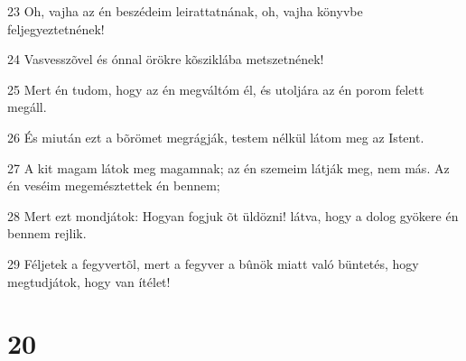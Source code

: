 \par 23 Oh, vajha az én beszédeim leirattatnának, oh, vajha könyvbe feljegyeztetnének!
\par 24 Vasvesszõvel és ónnal örökre kõsziklába metszetnének!
\par 25 Mert én tudom, hogy az én megváltóm él, és utoljára az én porom felett megáll.
\par 26 És miután ezt a bõrömet megrágják, testem nélkül látom meg az Istent.
\par 27 A kit magam látok meg magamnak; az én szemeim látják meg, nem más. Az én veséim megemésztettek én bennem;
\par 28 Mert ezt mondjátok: Hogyan fogjuk õt üldözni! látva, hogy a dolog gyökere én bennem rejlik.
\par 29 Féljetek a fegyvertõl, mert a fegyver a bûnök miatt való büntetés, hogy megtudjátok, hogy van ítélet!

\chapter{20}

